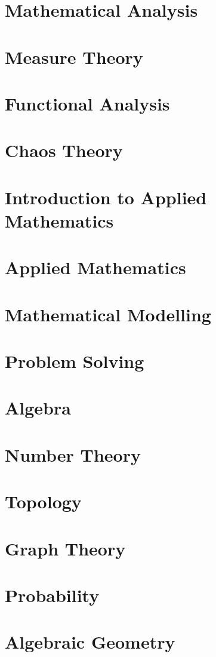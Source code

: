 \documentclass[oneside]{book}
\theoremstyle{mystyle}
\begin{document}
\chapter{Mathematical Analysis}
\chapter{Measure Theory}
\chapter{Functional Analysis}
\chapter{Chaos Theory}
\chapter{Introduction to Applied Mathematics}
\chapter{Applied Mathematics}
\chapter{Mathematical Modelling}
\chapter{Problem Solving}
\chapter{Algebra}
\chapter{Number Theory}
\chapter{Topology}
\chapter{Graph Theory}
\chapter{Probability}
\chapter{Algebraic Geometry}
\end{document}
